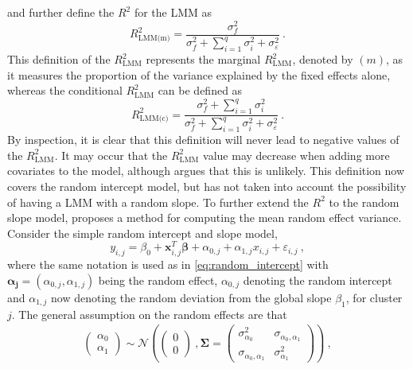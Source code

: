 and further define the $R^2$ for the LMM as
\begin{equation}
    R^2_{\text{LMM(m)}} = \frac{\sigma^2_f}{\sigma^2_f + \sum_{i=1}^{q}\sigma^2_{i} + \sigma^2_{\varepsilon}} \ .
\end{equation}
This definition of the $R^2_{\text{LMM}}$ represents the marginal $R^2_{\text{LMM}}$, denoted by $(m)$, as it measures the proportion of the variance explained by the fixed effects alone, whereas the conditional $R^2_\text{LMM}$ can be defined as 
\begin{equation}
    R^2_{\text{LMM(c)}} = \frac{\sigma^2_f + \sum_{i=1}^{q}\sigma^2_{i}}{\sigma^2_f + \sum_{i=1}^{q}\sigma^2_{i} + \sigma^2_{\varepsilon}} \ .
\end{equation}
By inspection, it is clear that this definition will never lead to negative values of the $R^2_{\text{LMM}}$. 
It may occur that the $R^2_{\text{LMM}}$ value may decrease when adding more covariates to the model, although \citet{nakagawa2013general} argues that this is unlikely.
This definition now covers the random intercept model, but has not taken into account the possibility of having a LMM with a random slope. 
To further extend the $R^2$ to the random slope model, \citet{Johnson2014} proposes a method for computing the mean random effect variance.
Consider the simple random intercept and slope model,
\begin{equation}
    y_{i, j} = \beta_0 + \mathbf{x}_{i, j}^T\boldsymbol{\beta} + \alpha_{0, j} + \alpha_{1, j}x_{i, j} + \varepsilon_{i, j} \ ,
\end{equation}
where the same notation is used as in \eqref{eq:random_intercept} with $\boldsymbol{\alpha_j}=(\alpha_{0, j}, \alpha_{1, j})$ being the random effect, $\alpha_{0, j}$ denoting the random intercept and $\alpha_{1, j}$ now denoting the random deviation from the global slope $\beta_1$, for cluster $j$.
The general assumption on the random effects are that 
\begin{equation}
    \begin{aligned}
    \begin{pmatrix}
        \alpha_0 \\
        \alpha_{1}
    \end{pmatrix} 
    \sim \mathcal{N}\left( 
    \begin{pmatrix}
        0 \\
        0
    \end{pmatrix} \ ,
    \boldsymbol{\Sigma} =
    \begin{pmatrix}
        \sigma^2_{\alpha_0} & \sigma_{\alpha_0, \alpha_1} \\
        \sigma_{\alpha_0, \alpha_1} & \sigma^2_{\alpha_1}
    \end{pmatrix} \right)  \ ,
    \end{aligned}
\end{equation}
